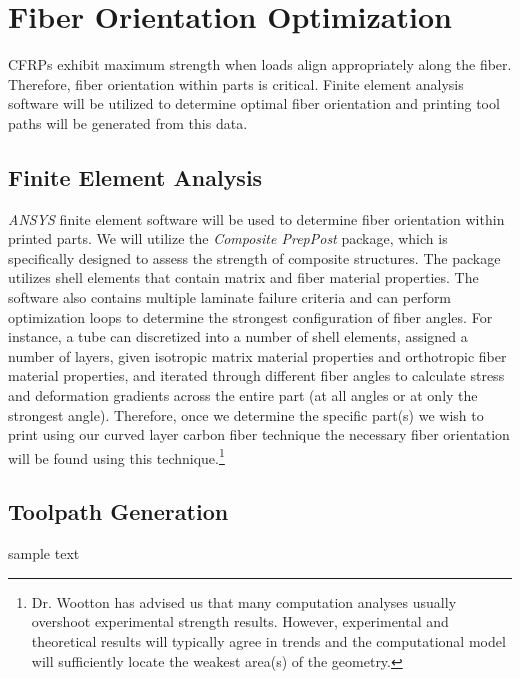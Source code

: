 \section{Fiber Orientation Optimization}

\indent

CFRPs exhibit maximum strength when loads align appropriately along the fiber. Therefore, fiber orientation within parts is critical. Finite element analysis software will be utilized to determine optimal fiber orientation and printing tool paths will be generated from this data.

\subsection{Finite Element Analysis}

\indent

\emph{ANSYS} finite element software will be used to determine fiber orientation within printed parts. We will utilize the \emph{Composite PrepPost} package, which is specifically designed to assess the strength of composite structures. The package utilizes shell elements that contain matrix and fiber material properties. The software also contains multiple laminate failure criteria and can perform optimization loops to determine the strongest configuration of fiber angles. For instance, a tube can discretized into a number of shell elements, assigned a number of layers, given isotropic matrix material properties and orthotropic fiber material properties, and iterated through different fiber angles to calculate stress and deformation gradients across the entire part (at all angles or at only the strongest angle). Therefore, once we determine the specific part(s) we wish to print using our curved layer carbon fiber technique the necessary fiber orientation will be found using this technique.\footnote{Dr. Wootton has advised us that many computation analyses usually overshoot experimental strength results. However, experimental and theoretical results will typically agree in trends and the computational model will sufficiently locate the weakest area(s) of the geometry.}\\

\subsection{Toolpath Generation}

\indent

sample text